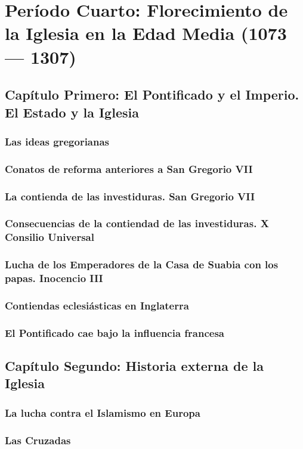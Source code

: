 \raggedbottom{} \documentclass[12pt, a4paper, openany]{book} %
\begin{document}
\part{Período Cuarto: Florecimiento de la Iglesia en la Edad Media (1073 --- 1307)}
\chapter{Capítulo Primero: El Pontificado y el Imperio. El Estado y la Iglesia}
\section{Las ideas gregorianas}
\section{Conatos de reforma anteriores a San Gregorio VII}
\section{La contienda de las investiduras. San Gregorio VII}
\section{Consecuencias de la contiendad de las investiduras. X Consilio Universal}
\section{Lucha de los Emperadores de la Casa de Suabia con los papas. Inocencio III}
\section{Contiendas eclesiásticas en Inglaterra}
\section{El Pontificado cae bajo la influencia francesa}
\chapter{Capítulo Segundo: Historia externa de  la Iglesia}
\section{La lucha contra el Islamismo en Europa}
\section{Las Cruzadas}
\end{document}
